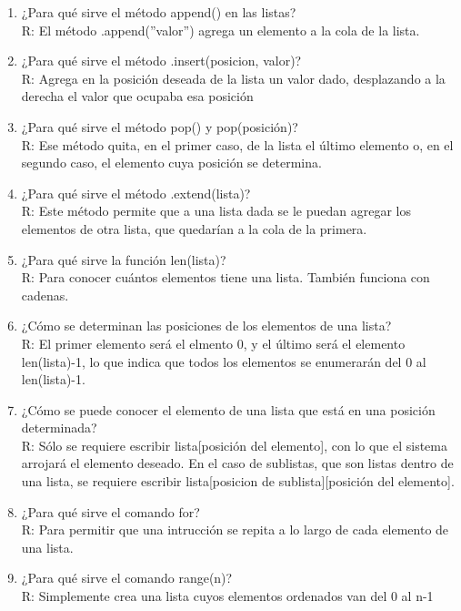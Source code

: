 \documentclass[letterpaper, 12pt, oneside]{article} %
\begin{document}
\begin{enumerate}
		\item ¿Para qué sirve el método append() en las listas?\\R: El método .append(”valor”) agrega un elemento a la cola de la lista.
		\item ¿Para qué sirve el método .insert(posicion, valor)?\\R: Agrega en la posición deseada de la lista un valor dado, desplazando a la derecha el valor que ocupaba esa posición
		\item ¿Para qué sirve el método pop() y pop(posición)?\\R: Ese método quita, en el primer caso, de la lista el último elemento o, en el segundo caso, el elemento cuya posición se determina.
		\item ¿Para qué sirve el método .extend(lista)?\\R: Este método permite que a una lista dada se le puedan agregar los elementos de otra lista, que quedarían a la cola de la primera.
		\item ¿Para qué sirve la función len(lista)?\\R: Para conocer cuántos elementos tiene una lista. También funciona con cadenas.
		\item ¿Cómo se determinan las posiciones de los elementos de una lista?\\R: El primer elemento será el elmento 0, y el último será el elemento len(lista)-1, lo que indica que todos los elementos se enumerarán del 0 al len(lista)-1.
		\item ¿Cómo se puede conocer el elemento de una lista que está en una posición determinada?\\R: Sólo se requiere escribir lista[posición del elemento], con lo que el sistema arrojará el elemento deseado. En el caso de sublistas, que son listas dentro de una lista, se requiere escribir lista[posicion de sublista][posición del elemento].
		\item ¿Para qué sirve el comando for?\\R: Para permitir que una intrucción se repita a lo largo de cada elemento de una lista.
		\item ¿Para qué sirve el comando range(n)?\\R: Simplemente crea una lista cuyos elementos ordenados van del 0 al n-1
	\end{enumerate}
\end{document}
